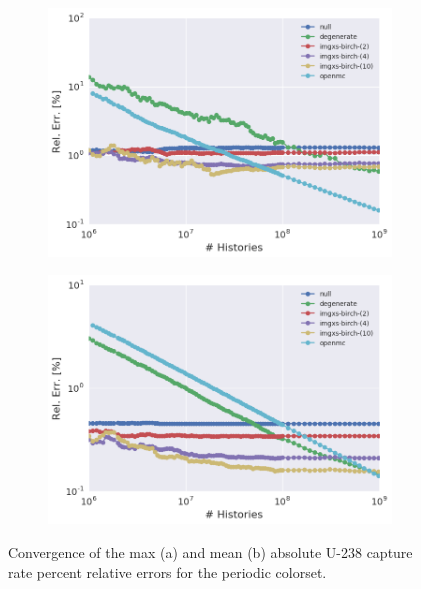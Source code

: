 \begin{figure}[h!]
\centering
\begin{subfigure}{\textwidth}
  \centering
  \includegraphics[width=0.9\linewidth]{figures/results/convergence/2x2/max-capt-err-evo}
  \caption{}
  \label{fig:chap11-2x2-capture-converge-max}
\end{subfigure}
\begin{subfigure}{\textwidth}
  \centering
  \includegraphics[width=0.9\linewidth]{figures/results/convergence/2x2/mean-capt-err-evo}
  \caption{}
  \label{fig:chap11-2x2-capture-converge-mean}
\end{subfigure}
\vspace{2mm}
\caption[Fission rate covergence for a 2$\times$2 colorset]{Convergence of the max (a) and mean (b) absolute U-238 capture rate percent relative errors for the periodic colorset.}
\label{fig:chap11-2x2-capture-converge}
\end{figure}

